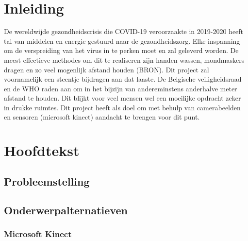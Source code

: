 \documentclass[a4paper,11pt]{article}
\begin{document}
	\begin{abstract}
		
	\end{abstract}
	
	
	
	\tableofcontents
	\newpage
	
	
	
	
	
	
	
	
	\section{Inleiding}
		De wereldwijde gezondheidscrisis die COVID-19 veroorzaakte in 2019-2020 heeft tal van middelen en energie gestuurd naar de gezondheidszorg. Elke inspanning om de verspreiding van het virus in te perken moet en zal geleverd worden. De meest effectieve methodes om dit te realiseren zijn handen wassen, mondmaskers dragen en zo veel mogenlijk afstand houden (BRON). Dit project zal voornamelijk een steentje bijdragen aan dat laaste. De Belgische veiligheidsraad en de WHO raden aan om in het bijzijn van andereminstens anderhalve meter afstand te houden. Dit blijkt voor veel mensen wel een moeilijke opdracht zeker in drukke ruimtes. Dit project heeft als doel om met behulp van camerabeelden en sensoren (microsoft kinect) aandacht te brengen voor dit punt.
	\section{Hoofdtekst}
	\subsection{Probleemstelling}
	\subsection{Onderwerpalternatieven}
	\subsubsection{Microsoft Kinect}
\end{document}
